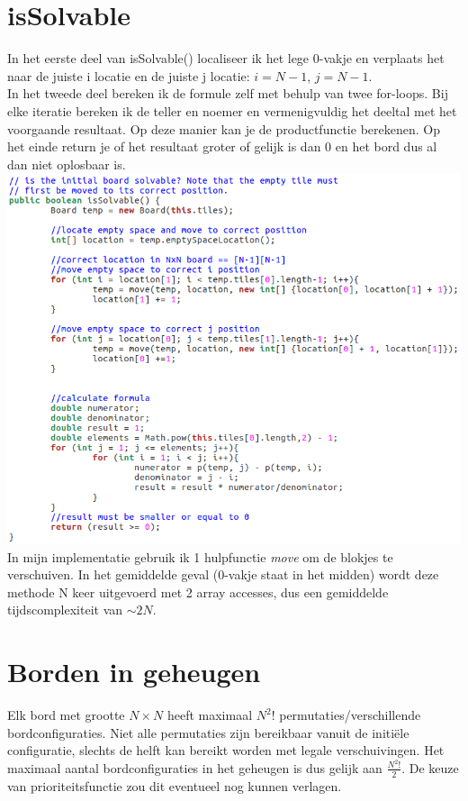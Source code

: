 \documentclass[11pt, a4paper]{article}
\begin{document}
\section*{isSolvable}
In het eerste deel van isSolvable() localiseer ik het lege 0-vakje en verplaats het naar de juiste i locatie en de juiste j locatie: $i=N-1$, $j=N-1$.\\
In het tweede deel bereken ik de formule zelf met behulp van twee for-loops. Bij elke iteratie bereken ik de teller en noemer en vermenigvuldig het deeltal met het voorgaande resultaat. Op deze manier kan je de productfunctie berekenen. Op het einde return je of het resultaat groter of gelijk is dan 0 en het bord dus al dan niet oplosbaar is.\\
\includegraphics[width=\textwidth]{isSolvable}\\

In mijn implementatie gebruik ik 1 hulpfunctie \emph{move} om de blokjes te verschuiven. In het gemiddelde geval (0-vakje staat in het midden) wordt deze methode N keer uitgevoerd met 2 array accesses, dus een gemiddelde tijdscomplexiteit van $\sim 2N$.

\section*{Borden in geheugen}
Elk bord met grootte $N \times N$ heeft maximaal $N^2$! permutaties/verschillende bordconfiguraties. Niet alle permutaties zijn bereikbaar vanuit de initi\"ele configuratie, slechts de helft kan bereikt worden met legale verschuivingen. Het maximaal aantal bordconfiguraties in het geheugen is dus gelijk aan $\frac{N^2!}{2}$. De keuze van prioriteitsfunctie zou dit eventueel nog kunnen verlagen.
	
\end{document}
